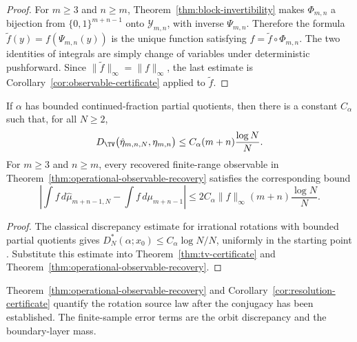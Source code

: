 \begin{proof}
For $m\ge3$ and $n\ge m$, Theorem~\ref{thm:block-invertibility} makes
$\Phi_{m,n}$ a bijection from $\{0,1\}^{m+n-1}$ onto
$\mathcal Y_{m,n}$, with inverse $\Psi_{m,n}$.  Therefore the formula
$\widetilde f(y)=f(\Psi_{m,n}(y))$ is the unique function satisfying
$f=\widetilde f\circ\Phi_{m,n}$.  The two identities of integrals are simply
change of variables under deterministic pushforward.  Since
$\|\widetilde f\|_\infty=\|f\|_\infty$, the last estimate is
Corollary~\ref{cor:observable-certificate} applied to $\widetilde f$.
\end{proof}

\begin{corollary}\label{cor:tv-bounded-type}
If $\alpha$ has bounded continued-fraction partial quotients, then there is a
constant $C_\alpha$ such that, for all $N\ge2$,
\[
D_{\TV}\bigl(\hat{\eta}_{m,n,N},\eta_{m,n}\bigr)
\le
C_\alpha(m+n)\frac{\log N}{N}.
\]
For $m\ge3$ and $n\ge m$, every recovered finite-range observable in
Theorem~\ref{thm:operational-observable-recovery} satisfies the corresponding
bound
\[
\left|
\int f\,d\hat{\mu}_{m+n-1,N}
-
\int f\,d\mu_{m+n-1}
\right|
\le
2C_\alpha\|f\|_\infty(m+n)\frac{\log N}{N}.
\]
\end{corollary}

\begin{proof}
The classical discrepancy estimate for irrational rotations with bounded
partial quotients gives
$D_N^*(\alpha;x_0)\le C_\alpha\log N/N$, uniformly in the starting point
\cite{KuipersNiederreiter1974,DrmotaTichy1997}.  Substitute this estimate into
Theorem~\ref{thm:tv-certificate} and
Theorem~\ref{thm:operational-observable-recovery}.
\end{proof}

\begin{remark}
Theorem~\ref{thm:operational-observable-recovery} and Corollary~\ref{cor:resolution-certificate} quantify the rotation source law after the conjugacy has been established. The finite-sample error terms are the orbit discrepancy and the boundary-layer mass.
\end{remark}
